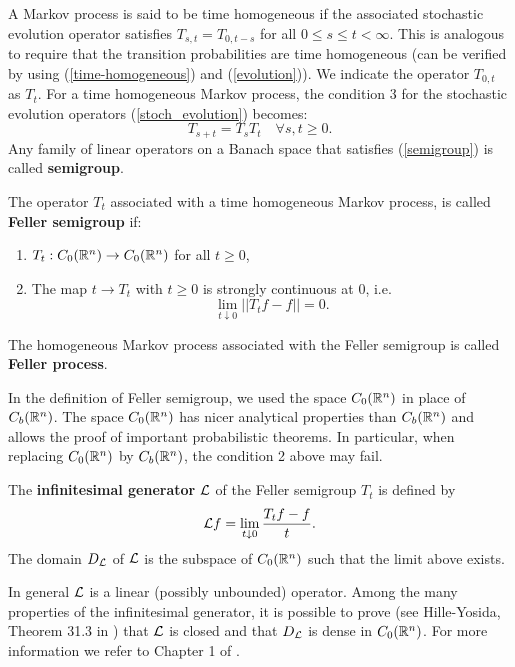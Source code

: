 \noindent
A Markov process is said to be time homogeneous if the associated stochastic evolution operator satisfies $T_{s,t} = T_{0,t-s}$ for all $0 \leq s \leq t < \infty$.
This is analogous to require that the transition probabilities are time homogeneous 
(can be verified by using (\ref{time-homogeneous}) and (\ref{evolution})). 
We indicate the operator $T_{0,t}$ as $T_t$. For a time homogeneous Markov process, the condition 3 for the stochastic evolution operators (\ref{stoch_evolution}) becomes:
\begin{equation}\label{semigroup}
 T_{s+t} = T_s T_t  \quad \forall s,t \geq 0. 
\end{equation}
Any family of linear operators on a Banach space that satisfies (\ref{semigroup}) is called \textbf{semigroup}.

\begin{Definition}
The operator $T_t$ associated with a time homogeneous Markov process, is called \textbf{Feller semigroup} if:
\begin{enumerate}
 \item $T_t : C_0(\mathbb{R}^n) \to C_0(\mathbb{R}^n) $ for all $t \geq 0$,
 \item The map $t \to T_t $ with $t \geq 0$ is strongly continuous at 0, i.e. $$\lim_{t \downarrow 0} ||T_t f - f|| = 0.$$ 
\end{enumerate} 
\end{Definition}
The homogeneous Markov process associated with the Feller semigroup is called \textbf{Feller process}.

In the definition of Feller semigroup, we used the space $C_0(\mathbb{R}^n)$ in place of $C_b(\mathbb{R}^n)$. 
The space $C_0(\mathbb{R}^n)$ has nicer analytical properties than $C_b(\mathbb{R}^n)$ and allows the proof of important probabilistic theorems.
In particular, when replacing $C_0(\mathbb{R}^n)$ by $C_b(\mathbb{R}^n)$, the condition 2 above may fail.

\begin{Definition}
The \textbf{infinitesimal generator} $\mathcal{L}$ of the Feller semigroup $T_t$ is defined by
\begin{equation}
 \mathcal{L} f =  \lim_{t \downarrow 0} \frac{T_t f - f}{t}.  
\end{equation}
The domain $D_{\mathcal{L}}$ of $\mathcal{L}$ is the subspace of $C_0(\mathbb{R}^n)$ such that the limit above exists. 
\end{Definition}
In general $\mathcal{L}$ is a linear (possibly unbounded) operator.
Among the many properties of the infinitesimal generator, it is possible to prove (see Hille-Yosida, Theorem 31.3 in \cite{Sato}) 
that $\mathcal{L}$ is closed and that $D_{\mathcal{L}}$ is dense in $C_0(\mathbb{R}^n)$.   
For more information we refer to Chapter 1 of \cite{EthierKurtz}.

